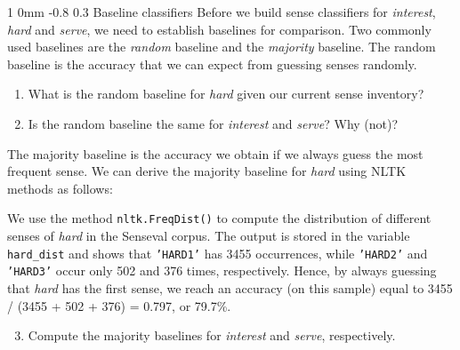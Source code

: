 \documentclass[11pt]{article}
\makeatletter
\newcommand{\newsec}[2]{\section{#1}\label{sec:#2}\noindent}
\renewcommand{\section}{\@startsection
{section}%
{1}%
{0mm}%
{-0.8\baselineskip}%
{0.3\baselineskip}%
{\bfseries\large}}%
\makeatother
\begin{document}
\newsec{Baseline classifiers }{baseline}%
Before we build sense classifiers for \emph{interest}, \emph{hard} and
\emph{serve}, we need to establish baselines for comparison.  Two
commonly used baselines are the \emph{random} baseline and the
\emph{majority} baseline. The random baseline is the accuracy that we
can expect from guessing senses randomly.
\begin{enumerate}[topsep=0.2cm,noitemsep]
\item  What is the random baseline for \emph{hard} given our current
  sense inventory?
\item  Is the random baseline the same for \emph{interest} and
  \emph{serve}? Why (not)?
\end{enumerate}
The majority baseline is the accuracy we obtain if we always guess the
most frequent sense. We can derive the majority baseline for
\emph{hard} using NLTK methods as follows:
\begin{center}
\fbox{
\scalebox{0.9}{

}}
\end{center}
We use the method {\tt nltk.FreqDist()} to compute the distribution of
different senses of \emph{hard} in the Senseval corpus. The output is
stored in the variable {\tt hard\_dist} and shows that {\tt 'HARD1'}
has 3455 occurrences, while {\tt 'HARD2'} and {\tt 'HARD3'} occur only
502 and 376 times, respectively. Hence, by always guessing that
\emph{hard} has the first sense, we reach an accuracy (on this sample)
equal to 3455 / (3455 + 502 + 376) = 0.797, or 79.7\%.
\begin{enumerate}[topsep=0.2cm,noitemsep]
\setcounter{enumi}{2}
\item Compute the majority baselines for \emph{interest} and \emph{serve}, respectively.
\end{enumerate}
\end{document}
